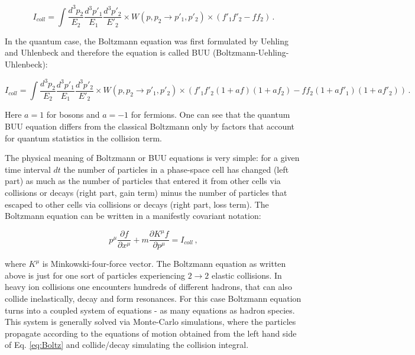 \begin{equation}
  I_{coll} = \int \frac{d^3p_2}{E_2} \frac{d^3p'_1}{E_1} \frac{d^3p'_2}{E'_2}
          \times W(p,p_2 \to p'_1, p'_2) \times (f'_1 f'_2 - f f_2) \,.
\end{equation}

In the quantum case, the Boltzmann equation was first formulated by Uehling and Uhlenbeck and
therefore the equation is called BUU (Boltzmann-Uehling-Uhlenbeck):

\begin{equation} \label{eq:buu_icoll}
  I_{coll} =  \int \frac{d^3p_2}{E_2} \frac{d^3p'_1}{E_1} \frac{d^3p'_2}{E'_2}
          \times W(p,p_2 \to p'_1, p'_2) \times (f'_1 f'_2(1 + af)(1 + af_2) - f f_2 (1 + af'_1) (1 + af'_2)) \,.
\end{equation}

Here $a = 1$ for bosons and $a = -1$ for fermions. One can see that the quantum BUU
equation differs from the classical Boltzmann only by factors that account for
quantum statistics in the collision term.

The physical meaning of Boltzmann or BUU equations is very simple: for a given time interval $dt$
the number of particles in a phase-space cell has changed (left part) as much as
the number of particles that entered it from other cells via collisions or decays
(right part, gain term) minus the number of particles that escaped to other cells
via collisions or decays (right part, loss term). The Boltzmann equation can be
written in a manifestly covariant notation:

\begin{equation} \label{eq:Boltz}
  p^{\mu}\frac{\partial\mathit{f}}{\partial x^{\mu}} +
  m \frac{\partial K^{\mu}\mathit{f}}{\partial p^{\mu}} = I_{coll} \,,
\end{equation}

where $K^{\mu}$ is Minkowski-four-force vector. The Boltzmann equation as written above
is just for one sort of particles experiencing $2\to 2$ elastic collisions. In heavy ion
collisions one encounters hundreds of different hadrons, that can also collide inelastically,
decay and form resonances. For this case
Boltzmann equation turns into a coupled system of equations - as many equations
as hadron species. This system is generally solved via Monte-Carlo
simulations, where the particles propagate according to the equations of motion
obtained from the left hand side of Eq. \ref{eq:Boltz} and collide/decay
simulating the collision integral.

